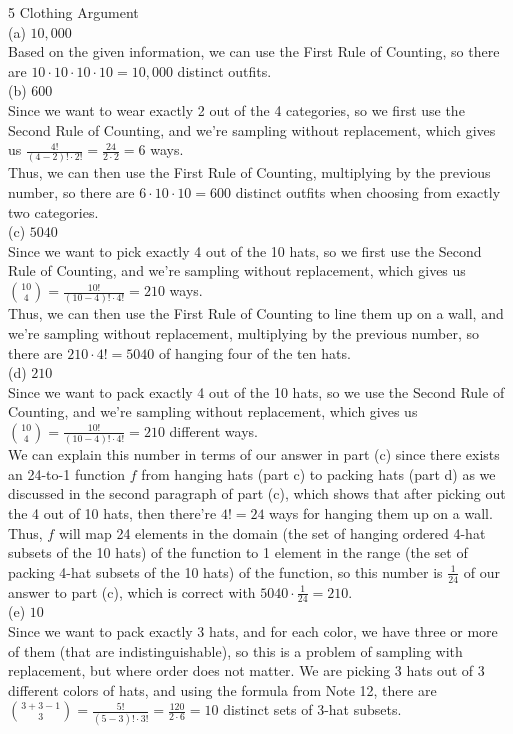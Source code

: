 \documentclass{article}
\begin{document}
{\Large 5 Clothing Argument} \\[.5cm]
{\color{red} (a) $10,000$} \\

Based on the given information, we can use the First Rule of Counting, so there are $10\cdot10\cdot10\cdot10 = 10,000$ distinct outfits. \\[.5cm]
{\color{red} (b) $600$} \\

Since we want to wear exactly 2 out of the 4 categories, so we first use the Second Rule of Counting, and we're sampling without replacement, which gives us $\frac{4!}{(4-2)!\cdot2!} = \frac{24}{2\cdot2} = 6$ ways. \\[.2cm]
\indent Thus, we can then use the First Rule of Counting, multiplying by the previous number, so there are $6\cdot10\cdot10 = 600$ distinct outfits when choosing from exactly two categories. \\[.5cm]
{\color{red} (c) $5040$} \\

Since we want to pick exactly 4 out of the 10 hats, so we first use the Second Rule of Counting, and we're sampling without replacement, which gives us $\binom{10}{4} = \frac{10!}{(10-4)!\cdot4!} = 210$ ways. \\[.2cm]
\indent Thus, we can then use the First Rule of Counting to line them up on a wall, and we're sampling without replacement, multiplying by the previous number, so there are $210\cdot 4! = 5040$ of hanging four of the ten hats. \\[.5cm]
{\color{red} (d) $210$} \\

Since we want to pack exactly 4 out of the 10 hats, so we use the Second Rule of Counting, and we're sampling without replacement, which gives us $\binom{10}{4} = \frac{10!}{(10-4)!\cdot4!} = 210$ different ways. \\[.2cm]
\indent We can explain this number in terms of our answer in part (c) since there exists an 24-to-1 function $f$ from hanging hats (part c) to packing hats (part d) as we discussed in the second paragraph of part (c), which shows that after picking out the 4 out of 10 hats, then there're $4! = 24$ ways for hanging them up on a wall. Thus, $f$ will map 24 elements in the domain (the set of hanging ordered 4-hat subsets of the 10 hats) of the function to 1 element in the range (the set of packing 4-hat subsets of the 10 hats) of the function, so this number is {\color{red} $\frac{1}{24}$} of our answer to part (c), which is correct with $5040\cdot\frac{1}{24} = 210$. \\[.5cm]
{\color{red} (e) $10$} \\

Since we want to pack exactly 3 hats, and for each color, we have three or more of them (that are indistinguishable), so this is a problem of sampling with replacement, but where order does not matter. We are picking 3 hats out of 3 different colors of hats, and using the formula from Note 12, there are $\binom{3+3-1}{3} = \frac{5!}{(5-3)!\cdot3!} = \frac{120}{2\cdot6} = 10$ distinct sets of 3-hat subsets.
\end{document}

